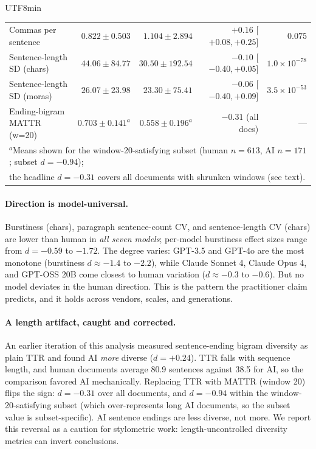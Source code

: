\documentclass[11pt,a4paper]{article}
\begin{document}
\begin{CJK}{UTF8}{min}
\begin{table}[H]
\begin{tabular}{lrrrr}
Commas per sentence & $0.822 \pm 0.503$ & $1.104 \pm 2.894$ & $+0.16$ [$+0.08, +0.25$] & $0.075$ \\
Sentence-length SD (chars) & $44.06 \pm 84.77$ & $30.50 \pm 192.54$ & $-0.10$ [$-0.40, +0.05$] & $1.0\times10^{-78}$ \\
Sentence-length SD (moras) & $26.07 \pm 23.98$ & $23.30 \pm 75.41$ & $-0.06$ [$-0.40, +0.09$] & $3.5\times10^{-53}$ \\
Ending-bigram MATTR (w=20) & $0.703 \pm 0.141^{a}$ & $0.558 \pm 0.196^{a}$ & $-0.31$ (all docs) & --- \\
\bottomrule
\multicolumn{5}{l}{\footnotesize $^{a}$Means shown for the window-20-satisfying subset (human $n=613$, AI $n=171$; subset $d=-0.94$);}\\
\multicolumn{5}{l}{\footnotesize \phantom{$^{a}$}the headline $d=-0.31$ covers all documents with shrunken windows (see text).}
\end{tabular}
\end{table}

\paragraph{Direction is model-universal.} Burstiness (chars), paragraph sentence-count CV, and sentence-length CV (chars) are lower than human in \emph{all seven models}; per-model burstiness effect sizes range from $d=-0.59$ to $-1.72$. The degree varies: GPT-3.5 and GPT-4o are the most monotone (burstiness $d \approx -1.4$ to $-2.2$), while Claude Sonnet 4, Claude Opus 4, and GPT-OSS 20B come closest to human variation ($d \approx -0.3$ to $-0.6$). But no model deviates in the human direction. This is the pattern the practitioner claim predicts, and it holds across vendors, scales, and generations.

\paragraph{A length artifact, caught and corrected.} An earlier iteration of this analysis measured sentence-ending bigram diversity as plain TTR and found AI \emph{more} diverse ($d=+0.24$). TTR falls with sequence length, and human documents average 80.9 sentences against 38.5 for AI, so the comparison favored AI mechanically. Replacing TTR with MATTR (window 20) flips the sign: $d=-0.31$ over all documents, and $d=-0.94$ within the window-20-satisfying subset (which over-represents long AI documents, so the subset value is subset-specific). AI sentence endings are less diverse, not more. We report this reversal as a caution for stylometric work: length-uncontrolled diversity metrics can invert conclusions.


\end{CJK}
\end{document}
